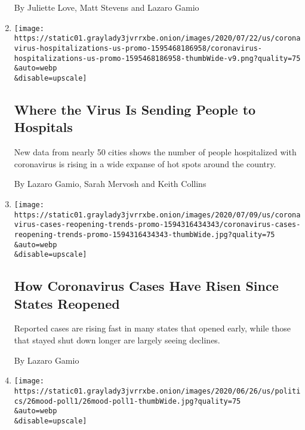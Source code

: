 \begin{enumerate}
  By Juliette Love, Matt Stevens and Lazaro Gamio
\item
  \href{/interactive/2020/07/23/us/coronavirus-hospitalizations-us.html}{}

  \texttt{[image: https://static01.graylady3jvrrxbe.onion/images/2020/07/22/us/coronavirus-hospitalizations-us-promo-1595468186958/coronavirus-hospitalizations-us-promo-1595468186958-thumbWide-v9.png?quality=75\\\&auto=webp\\\&disable=upscale]}

  \hypertarget{where-the-virus-is-sending-people-to-hospitals}{%
  \subsection{Where the Virus Is Sending People to
  Hospitals}\label{where-the-virus-is-sending-people-to-hospitals}}

  New data from nearly 50 cities shows the number of people hospitalized
  with coronavirus is rising in a wide expanse of hot spots around the
  country.

  By Lazaro Gamio, Sarah Mervosh and Keith Collins
\item
  \href{/interactive/2020/07/09/us/coronavirus-cases-reopening-trends.html}{}

  \texttt{[image: https://static01.graylady3jvrrxbe.onion/images/2020/07/09/us/coronavirus-cases-reopening-trends-promo-1594316434343/coronavirus-cases-reopening-trends-promo-1594316434343-thumbWide.jpg?quality=75\\\&auto=webp\\\&disable=upscale]}

  \hypertarget{how-coronavirus-cases-have-risen-since-states-reopened}{%
  \subsection{How Coronavirus Cases Have Risen Since States
  Reopened}\label{how-coronavirus-cases-have-risen-since-states-reopened}}

  Reported cases are rising fast in many states that opened early, while
  those that stayed shut down longer are largely seeing declines.

  By Lazaro Gamio
\item
  \href{/2020/06/27/us/politics/coronavirus-trump-mood-poll.html}{}

  \texttt{[image: https://static01.graylady3jvrrxbe.onion/images/2020/06/26/us/politics/26mood-poll1/26mood-poll1-thumbWide.jpg?quality=75\\\&auto=webp\\\&disable=upscale]}

  \hypertarget{how-americans-feel-about-the-country-right-now-anxious-hopeful}{%
}
\end{enumerate}
